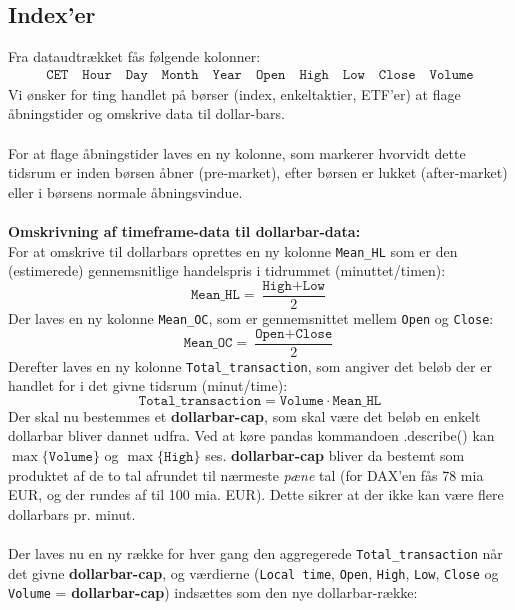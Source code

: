 \documentclass[a4paper,danish,12pt]{article}
\begin{document}
\subsection*{Index'er}
Fra dataudtrækket fås følgende kolonner:
\begin{align*} 
\texttt{CET}
\quad \texttt{Hour}
\quad \texttt{Day}
\quad \texttt{Month}
\quad \texttt{Year}
\quad \texttt{Open}
\quad \texttt{High}
\quad \texttt{Low}
\quad \texttt{Close}
\quad \texttt{Volume}
\end{align*}
Vi ønsker for ting handlet på børser (index, enkeltaktier, ETF'er) at flage åbningstider og omskrive data til dollar-bars.\\
\\
For at flage åbningstider laves en ny kolonne, som markerer hvorvidt dette tidsrum er inden børsen åbner (pre-market), efter børsen er lukket (after-market) eller i børsens normale åbningsvindue.
\\\\
\textbf{Omskrivning af timeframe-data til dollarbar-data:} \\
For at omskrive til dollarbars oprettes en ny kolonne \texttt{Mean\_HL} som er den (estimerede) gennemsnitlige handelspris i tidrummet (minuttet/timen):
\begin{equation*}
\texttt{Mean\_HL} = \frac{\texttt{High}+\texttt{Low}}{2}
\end{equation*} 
Der laves en ny kolonne \texttt{Mean\_OC}, som er gennemsnittet mellem \texttt{Open} og \texttt{Close}:
\begin{equation*}
\texttt{Mean\_OC} = \frac{\texttt{Open}+\texttt{Close}}{2}
\end{equation*} 
Derefter laves en ny kolonne \texttt{Total\_transaction}, som angiver det beløb der er handlet for i det givne tidsrum (minut/time):
\begin{equation*}
\texttt{Total\_transaction} = \texttt{Volume} \cdot \texttt{Mean\_HL}
\end{equation*}
Der skal nu bestemmes et \textbf{dollarbar-cap}, som skal være det beløb en enkelt dollarbar bliver dannet udfra. Ved at køre pandas kommandoen .describe() kan $\max\{ \texttt{Volume} \}$ og $\max\{ \texttt{High} \}$ ses. \textbf{dollarbar-cap} bliver da bestemt som produktet af de to tal afrundet til nærmeste \textit{pæne} tal (for DAX'en fås 78 mia EUR, og der rundes af til 100 mia. EUR). Dette sikrer at der ikke kan være flere dollarbars pr. minut.\\
\\
Der laves nu en ny række for hver gang den aggregerede \texttt{Total\_transaction} når det givne \textbf{dollarbar-cap}, og værdierne (\texttt{Local time}, \texttt{Open}, \texttt{High}, \texttt{Low}, \texttt{Close} og \texttt{Volume} = \textbf{dollarbar-cap}) indsættes som den nye dollarbar-række:
\end{document}

